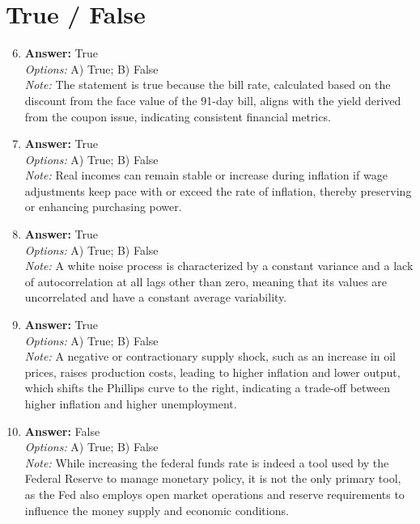 \documentclass[12pt]{article}
\begin{document}
\section*{True / False}
\begin{enumerate}[label=\arabic*.]
\setcounter{enumi}{5}
\item \textbf{Answer:} True
\\ \textit{Options:} A) True; B) False
\\ \textit{Note:} The statement is true because the bill rate, calculated based on the discount from the face value of the 91-day bill, aligns with the yield derived from the coupon issue, indicating consistent financial metrics.
\item \textbf{Answer:} True
\\ \textit{Options:} A) True; B) False
\\ \textit{Note:} Real incomes can remain stable or increase during inflation if wage adjustments keep pace with or exceed the rate of inflation, thereby preserving or enhancing purchasing power.
\item \textbf{Answer:} True
\\ \textit{Options:} A) True; B) False
\\ \textit{Note:} A white noise process is characterized by a constant variance and a lack of autocorrelation at all lags other than zero, meaning that its values are uncorrelated and have a constant average variability.
\item \textbf{Answer:} True
\\ \textit{Options:} A) True; B) False
\\ \textit{Note:} A negative or contractionary supply shock, such as an increase in oil prices, raises production costs, leading to higher inflation and lower output, which shifts the Phillips curve to the right, indicating a trade-off between higher inflation and higher unemployment.
\item \textbf{Answer:} False
\\ \textit{Options:} A) True; B) False
\\ \textit{Note:} While increasing the federal funds rate is indeed a tool used by the Federal Reserve to manage monetary policy, it is not the only primary tool, as the Fed also employs open market operations and reserve requirements to influence the money supply and economic conditions.
\end{enumerate}
\end{document}
